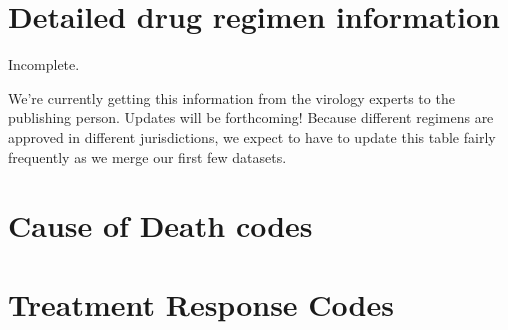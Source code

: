 \documentclass{article}
\begin{document}
\newpage
\appendix

\section{Detailed drug regimen information}
\label{apx:drug-regimens}

Incomplete.

We're currently getting this information from the virology experts to
the publishing person. Updates will be forthcoming! Because different
regimens are approved in different jurisdictions, we expect to have to
update this table fairly frequently as we merge our first few
datasets.


\section{Cause of Death codes}
\label{apx:cod}



\section{Treatment Response Codes}
\label{apx:response}

\end{document}
